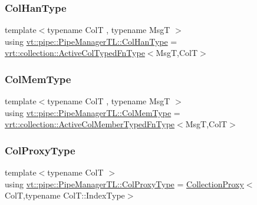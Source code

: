 \subsubsection{\texorpdfstring{Col\+Han\+Type}{ColHanType}}
{\footnotesize\ttfamily template$<$typename ColT , typename MsgT $>$ \\
using \hyperlink{structvt_1_1pipe_1_1_pipe_manager_t_l_a0bf4e2e805b3ce2be9f499e0e39aadfa}{vt\+::pipe\+::\+Pipe\+Manager\+T\+L\+::\+Col\+Han\+Type} =  \hyperlink{namespacevt_1_1vrt_1_1collection_a1f4b9c5fe895842f49952a29592bc206}{vrt\+::collection\+::\+Active\+Col\+Typed\+Fn\+Type}$<$MsgT,ColT$>$}

\mbox{\label{structvt_1_1pipe_1_1_pipe_manager_t_l_abf7ad21be4f3d0db51d643aa8ea959cc}} 
\subsubsection{\texorpdfstring{Col\+Mem\+Type}{ColMemType}}
{\footnotesize\ttfamily template$<$typename ColT , typename MsgT $>$ \\
using \hyperlink{structvt_1_1pipe_1_1_pipe_manager_t_l_abf7ad21be4f3d0db51d643aa8ea959cc}{vt\+::pipe\+::\+Pipe\+Manager\+T\+L\+::\+Col\+Mem\+Type} =  \hyperlink{namespacevt_1_1vrt_1_1collection_a87925616c03cf4ccc548d33b2fe172ee}{vrt\+::collection\+::\+Active\+Col\+Member\+Typed\+Fn\+Type}$<$MsgT,ColT$>$}

\mbox{\label{structvt_1_1pipe_1_1_pipe_manager_t_l_af56c58cad882496e35f01227d4da3898}} 
\subsubsection{\texorpdfstring{Col\+Proxy\+Type}{ColProxyType}}
{\footnotesize\ttfamily template$<$typename ColT $>$ \\
using \hyperlink{structvt_1_1pipe_1_1_pipe_manager_t_l_af56c58cad882496e35f01227d4da3898}{vt\+::pipe\+::\+Pipe\+Manager\+T\+L\+::\+Col\+Proxy\+Type} =  \hyperlink{namespacevt_a0d58a693bfb96e0ce5d145692a1a1f98}{Collection\+Proxy}$<$ColT,typename Col\+T\+::\+Index\+Type$>$}

